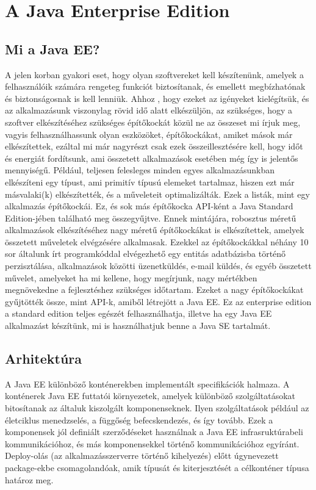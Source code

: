\documentclass[centeredchapter]{thesis-ekf}
\theoremstyle{definition}
\theoremstyle{remark}
\begin{document}
\chapter{A Java Enterprise Edition}

\section{Mi a Java EE?}

A jelen korban gyakori eset, hogy olyan szoftvereket kell készítenünk, amelyek a felhasználóik számára rengeteg funkciót biztosítanak, és emellett megbízhatónak és biztonságosnak is kell lenniük. Ahhoz , hogy ezeket az igényeket kielégítsük, és az alkalmazásunk viszonylag rövid idő alatt elkészüljön, az szükséges, hogy a szoftver elkészítéséhez szükséges építőkockát közül ne az összeset mi írjuk meg, vagyis felhasználhassunk olyan eszközöket, építőkockákat, amiket mások már elkészítettek, ezáltal mi már nagyrészt csak ezek összeillesztésére kell, hogy időt és energiát fordítsunk, ami összetett alkalmazások esetében még így is jelentős mennyiségű. 
Például, teljesen felesleges minden egyes alkalmazásunkban elkészíteni egy típust, ami primitív típusú elemeket tartalmaz, hiszen ezt már másvalaki(k) elkészítették, és a műveleteit optimalizálták. Ezek a listák, mint egy alkalmazás építőkockái. Ez, és sok más építőkocka API-ként a Java Standard Edition-jében található meg összegyűjtve.
Ennek mintájára, robosztus méretű alkalmazások elkészítéséhez nagy méretű építőkockákat is elkészítettek, amelyek összetett műveletek elvégzésére alkalmasak. Ezekkel az építőkockákkal néhány 10 sor általunk írt programkóddal elvégezhető egy entitás adatbázisba történő perzisztálása, alkalmazások közötti üzenetküldés, e-mail küldés, és egyéb összetett művelet, amelyeket ha mi kellene, hogy megírjunk, nagy mértékben megnövekedne a fejlesztéshez szükséges időtartam.
Ezeket a nagy építőkockákat gyűjtötték össze, mint API-k, amiből létrejött a Java EE.
Ez az enterprise edition a standard edition teljes egészét felhasználhatja, illetve ha egy Java EE alkalmazást készítünk, mi is használhatjuk benne a Java SE tartalmát.

\section{Arhitektúra}

A Java EE különböző konténerekben implementált specifikációk halmaza. A konténerek Java EE futtatói környezetek, amelyek különböző szolgáltatásokat bitosítanak az általuk kiszolgált komponenseknek. Ilyen szolgáltatások például az életciklus menedzselés, a függőség befecskendezés, és így tovább. Ezek a komponensek jól definiált szerződéseket használnak a Java EE infrasruktúrabeli kommunikációhoz, és más komponensekkel történő kommunikációhoz egyíránt. Deploy-olás (az alkalmazásszerverre történő kihelyezés) előtt úgynevezett package-ekbe csomagolandóak, amik típusát és kiterjesztését a célkonténer típusa határoz meg.
\end{document}
